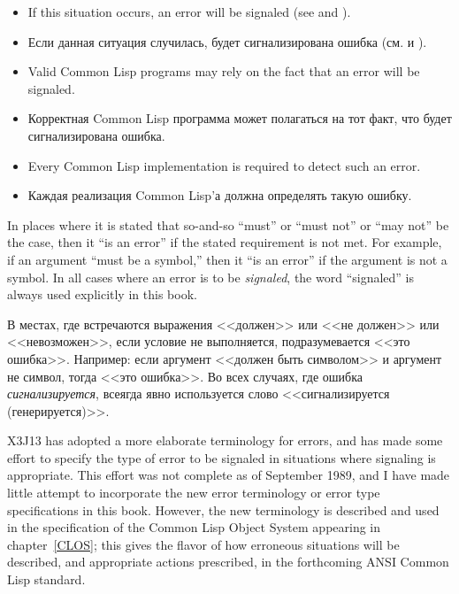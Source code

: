 \begin{itemize}
\item If this situation occurs, an error will be signaled
(see  and ).

\item Если данная ситуация случилась, будет сигнализирована ошибка
(см.  и ).

\item Valid Common Lisp programs may rely on the fact that an error will be
signaled.

\item Корректная Common Lisp программа может полагаться на тот факт, что будет
сигнализирована ошибка.

\item Every Common Lisp implementation is required to detect such an error.

\item Каждая реализация Common Lisp'а должна определять такую ошибку.
\end{itemize}

In places where it is stated that so-and-so ``must'' or ``must not''
or ``may not''  be the case, then it ``is an error'' if the stated requirement
is not met.  For example, if an argument ``must be a symbol,'' then it
``is an error'' if the argument is not a symbol.  In all cases where
an error is to be {\it signaled}, the word ``signaled'' is always used
explicitly in this book.

В местах, где встречаются выражения <<должен>> или <<не должен>> или
<<невозможен>>, если условие не
выполняется, подразумевается <<это ошибка>>. Например: если аргумент <<должен
быть символом>> и аргумент не символ, тогда <<это
ошибка>>. Во всех случаях, где ошибка {\it
сигнализируется}, всеягда явно используется слово <<сигнализируется (генерируется)>>.

\begin{newer}
X3J13 has adopted a more elaborate terminology for errors,
and has made some effort to specify the type of error to be signaled
in situations where signaling is appropriate.  This effort
was not complete as of September 1989, and I have made little
attempt to incorporate the new error terminology or
error type specifications in this book.  However, the new terminology
is described and used in the specification of the
Common Lisp Object System appearing in chapter~\ref{CLOS}; this gives
the flavor of how erroneous situations will be described,
and appropriate actions prescribed, in the forthcoming ANSI Common
Lisp standard.
\end{newer}

